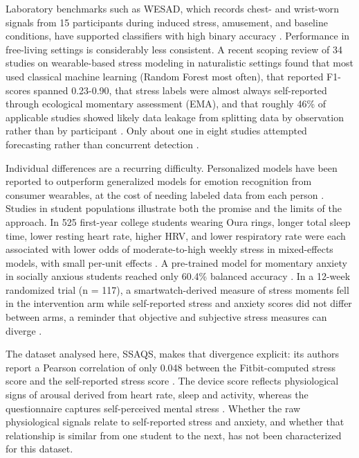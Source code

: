 \documentclass[11pt, a4paper, oneside]{article}
\begin{document}
Laboratory benchmarks such as WESAD, which records chest- and wrist-worn signals from 15 participants during induced stress, amusement, and baseline conditions, have supported classifiers with high binary accuracy \cite{reference 6}. Performance in free-living settings is considerably less consistent. A recent scoping review of 34 studies on wearable-based stress modeling in naturalistic settings found that most used classical machine learning (Random Forest most often), that reported F1-scores spanned 0.23-0.90, that stress labels were almost always self-reported through ecological momentary assessment (EMA), and that roughly 46\% of applicable studies showed likely data leakage from splitting data by observation rather than by participant \cite{reference 7}. Only about one in eight studies attempted forecasting rather than concurrent detection \cite{reference 4}.

Individual differences are a recurring difficulty. Personalized models have been reported to outperform generalized models for emotion recognition from consumer wearables, at the cost of needing labeled data from each person \cite{reference 8}. Studies in student populations illustrate both the promise and the limits of the approach. In 525 first-year college students wearing Oura rings, longer total sleep time, lower resting heart rate, higher HRV, and lower respiratory rate were each associated with lower odds of moderate-to-high weekly stress in mixed-effects models, with small per-unit effects \cite{reference 2}. A pre-trained model for momentary anxiety in socially anxious students reached only 60.4\% balanced accuracy \cite{reference 7}. In a 12-week randomized trial (n = 117), a smartwatch-derived measure of stress moments fell in the intervention arm while self-reported stress and anxiety scores did not differ between arms, a reminder that objective and subjective stress measures can diverge \cite{reference 3}.

The dataset analysed here, SSAQS, makes that divergence explicit: its authors report a Pearson correlation of only 0.048 between the Fitbit-computed stress score and the self-reported stress score \cite{reference 4}. The device score reflects physiological signs of arousal derived from heart rate, sleep and activity, whereas the questionnaire captures self-perceived mental stress \cite{reference 4}. Whether the raw physiological signals relate to self-reported stress and anxiety, and whether that relationship is similar from one student to the next, has not been characterized for this dataset.
\end{document}
